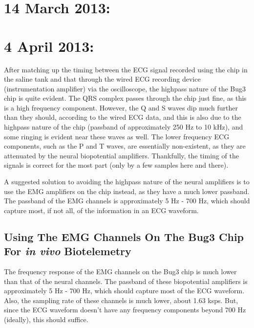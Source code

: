 \documentclass[12pt,onecolumn,titlepage]{article}
\begin{document}
\clearpage
\section{14 March 2013:}

\indent \indent 





\clearpage
\section{4 April 2013:}

\indent \indent After matching up the timing between the ECG signal recorded using the chip in the saline tank and that through the wired ECG recording device (instrumentation amplifier) via the oscilloscope, the highpass nature of the Bug3 chip is quite evident. The QRS complex passes through the chip just fine, as this is a high frequency component. However, the Q and S waves dip much further than they should, according to the wired ECG data, and this is also due to the highpass nature of the chip (passband of approximately 250 Hz to 10 kHz), and some ringing is evident near these waves as well. The lower frequency ECG components, such as the P and T waves, are essentially non-existent, as they are attenuated by the neural biopotential amplifiers. Thankfully, the timing of the signals is correct for the most part (only by a few samples here and there).

A suggested solution to avoiding the highpass nature of the neural amplifiers is to use the EMG amplifiers on the chip instead, as they have a much lower passband. The passband of the EMG channels is approximately 5 Hz - 700 Hz, which should capture most, if not all, of the information in an ECG waveform.

\subsection{Using The EMG Channels On The Bug3 Chip For {\emph{in vivo}} Biotelemetry}
\indent \indent The frequency response of the EMG channels on the Bug3 chip is much lower than that of the neural channels. The passband of these biopotential amplifiers is approximately 5 Hz - 700 Hz, which should capture most of the ECG waveform. Also, the sampling rate of these channels is much lower, about 1.63 ksps. But, since the ECG waveform doesn't have any frequency components beyond 700 Hz (ideally), this should suffice.
\end{document}
